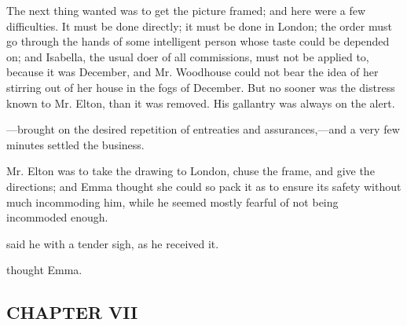 The next thing wanted was to get the picture framed; and here were a few difficulties. It must be done directly; it must be done in London; the order must go through the hands of some intelligent person whose taste could be depended on; and Isabella, the usual doer of all commissions, must not be applied to, because it was December, and Mr. Woodhouse could not bear the idea of her stirring out of her house in the fogs of December. But no sooner was the distress known to Mr. Elton, than it was removed. His gallantry was always on the alert. 

---brought on the desired repetition of entreaties and assurances,---and a very few minutes settled the business.

Mr. Elton was to take the drawing to London, chuse the frame, and give the directions; and Emma thought she could so pack it as to ensure its safety without much incommoding him, while he seemed mostly fearful of not being incommoded enough.

 said he with a tender sigh, as he received it.

 thought Emma. 

\subsection[chapter-vii]{\useURL[url7][][][]\from[url7]CHAPTER VII}

